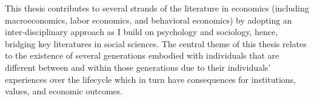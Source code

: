 This thesis contributes to several strands of the literature in economics (including macroeconomics, labor economics, and behavioral economics) by adopting an inter-disciplinary approach as I build on psychology and sociology, hence, bridging key literatures in social sciences. The central theme of this thesis relates to the existence of several generations embodied with individuals that are different between and within those generations due to their individuals' experiences over the lifecycle which in turn have consequences for institutions, values, and economic outcomes.

\printbibliography[heading=subbibliography]